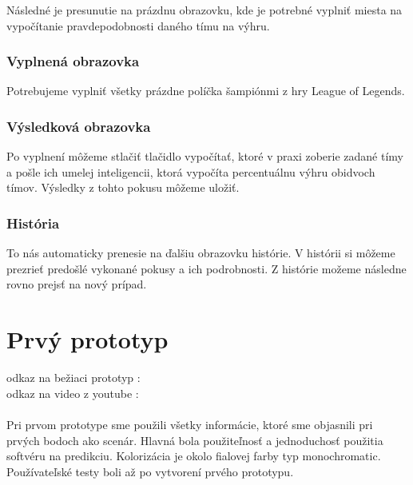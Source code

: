 Následné je presunutie na prázdnu obrazovku, kde je potrebné vyplniť miesta na vypočítanie pravdepodobnosti daného tímu na výhru.

\subsubsection{Vyplnená obrazovka}

Potrebujeme vyplniť všetky prázdne políčka šampiónmi z hry League of Legends.

\subsubsection{Výsledková obrazovka}

Po vyplnení môžeme stlačiť tlačidlo vypočítať, ktoré v praxi zoberie zadané tímy a pošle ich umelej inteligencii, ktorá vypočíta percentuálnu výhru obidvoch tímov. Výsledky z tohto pokusu môžeme uložiť.

\subsubsection{História}

To nás automaticky prenesie na ďalšiu obrazovku histórie. V histórii si môžeme prezrieť predošlé vykonané pokusy a ich podrobnosti. Z histórie možeme následne rovno prejsť na nový prípad.





\section*{Prvý prototyp}

odkaz na bežiaci prototyp :
\cite{figma}
\\
odkaz na video z youtube :
\cite{youtube}
	\\ \\
Pri prvom prototype sme použili všetky informácie, ktoré sme objasnili pri prvých bodoch ako scenár. Hlavná bola použiteľnosť a jednoduchosť použitia softvéru na predikciu. Kolorizácia je okolo fialovej farby typ monochromatic. Používateľské testy boli až po vytvorení prvého prototypu. 


